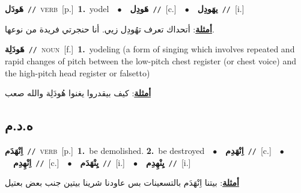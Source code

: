 \documentclass[10pt,a4paper,twoside]{article} %
\begin{document}
\begin{multicols}{2}
{\setlength\topsep{0pt}\textbf{\foreignlanguage{arabic}{هَودَل}}\ {\color{gray}\texttt{//}\color{black}}\ \textsc{verb}\ [p.]\ \textbf{1.}~yodel\ \ $\bullet$\ \ \setlength\topsep{0pt}\textbf{\foreignlanguage{arabic}{هَودِل}}\ {\color{gray}\texttt{//}\color{black}}\ [c.]\ \ $\bullet$\ \ \setlength\topsep{0pt}\textbf{\foreignlanguage{arabic}{يهَودِل}}\ {\color{gray}\texttt{//}\color{black}}\ [i.]\  \begin{flushright}\color{gray}\foreignlanguage{arabic}{\textbf{\underline{\foreignlanguage{arabic}{أمثلة}}}: أتحداك تعرف تهُودِل زيي. أنا حنجرتي فريدة من نوعها.}\end{flushright}\color{black}} \vspace{2mm}

{\setlength\topsep{0pt}\textbf{\foreignlanguage{arabic}{هَودَلِة}}\ {\color{gray}\texttt{//}\color{black}}\ \textsc{noun}\ [f.]\ \textbf{1.}~yodeling (a form of singing which involves repeated and rapid changes of pitch between the low-pitch chest register (or chest voice) and the high-pitch head register or falsetto)\  \begin{flushright}\color{gray}\foreignlanguage{arabic}{\textbf{\underline{\foreignlanguage{arabic}{أمثلة}}}: كيف بيقدروا يغنوا هُودَلِة والله صعب}\end{flushright}\color{black}} \vspace{2mm}

\vspace{-3mm}
\subsection*{\color{blue}\foreignlanguage{arabic}{ه.د.م}\color{blue}{}} 

{\setlength\topsep{0pt}\textbf{\foreignlanguage{arabic}{اِنْهَدَم}}\ {\color{gray}\texttt{//}\color{black}}\ \textsc{verb}\ [p.]\ \textbf{1.}~be demolished.  \textbf{2.}~be destroyed\ \ $\bullet$\ \ \setlength\topsep{0pt}\textbf{\foreignlanguage{arabic}{اِنْهَدِم}}\ {\color{gray}\texttt{//}\color{black}}\ [c.]\ \ $\bullet$\ \ \setlength\topsep{0pt}\textbf{\foreignlanguage{arabic}{اِنْهِدِم}}\ {\color{gray}\texttt{//}\color{black}}\ [c.]\ \ $\bullet$\ \ \setlength\topsep{0pt}\textbf{\foreignlanguage{arabic}{يِنْهَدَم}}\ {\color{gray}\texttt{//}\color{black}}\ [i.]\ \ $\bullet$\ \ \setlength\topsep{0pt}\textbf{\foreignlanguage{arabic}{يِنْهِدِم}}\ {\color{gray}\texttt{//}\color{black}}\ [i.]\  \begin{flushright}\color{gray}\foreignlanguage{arabic}{\textbf{\underline{\foreignlanguage{arabic}{أمثلة}}}: بيتنا اِنْهَدَم بالتسعينات بس عاودنا شرينا بيتين جنب بعض بعتيل}\end{flushright}\color{black}} \vspace{2mm}


\end{multicols}
\end{document}
